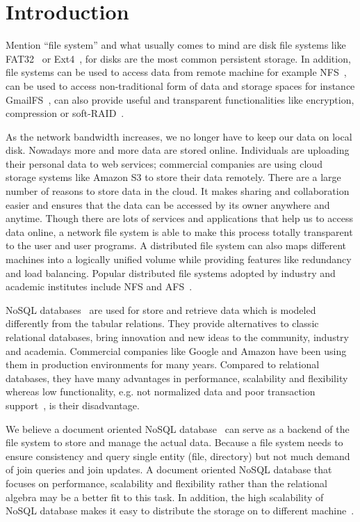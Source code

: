 \chapter{Introduction}
\label{chap:intro}

    Mention ``file system'' and what usually comes to mind are disk file systems like FAT32~\cite{fat_wiki} or Ext4~\cite{ext4}, for disks are the most common persistent storage. In addition, file systems can be used to access data from remote machine for example NFS~\cite{nfs}, can be used to access non-traditional form of data and storage spaces for instance GmailFS~\cite{gmailfs, gmailfs2}, can also provide useful and transparent functionalities like encryption, compression or soft-RAID~\cite{encrypt, compression}.

    As the network bandwidth increases, we no longer have to keep our data on local disk. Nowadays more and more data are stored online. Individuals are uploading their personal data to web services; commercial companies are using cloud storage systems like Amazon S3 to store their data remotely. There are a large number of reasons to store data in the cloud. It makes sharing and collaboration easier and ensures that the data can be accessed by its owner anywhere and anytime. Though there are lots of services and applications that help us to access data online, a network file system is able to make this process totally transparent to the user and user programs. A distributed file system can also maps different machines into a logically unified volume while providing features like redundancy and load balancing. Popular distributed file systems adopted by industry and academic institutes include NFS and AFS~\cite{afs}.

    NoSQL databases~\cite{nosql} are used for store and retrieve data which is modeled differently from the tabular relations. They provide alternatives to classic relational databases, bring innovation and new ideas to the community, industry and academia. Commercial companies like Google and Amazon have been using them in production environments for many years. Compared to relational databases, they have many advantages in performance, scalability and flexibility whereas low functionality, e.g. not normalized data and poor transaction support~\cite{transaction}, is their disadvantage.

    We believe a document oriented NoSQL database~\cite{docdb} can serve as a backend of the file system to store and manage the actual data. Because a file system needs to ensure consistency and query single entity (file, directory) but not much demand of join queries and join updates. A document oriented NoSQL database that focuses on performance, scalability and flexibility rather than the relational algebra may be a better fit to this task. In addition, the high scalability of NoSQL database makes it easy to distribute the storage on to different machine~\cite{sharding}.

